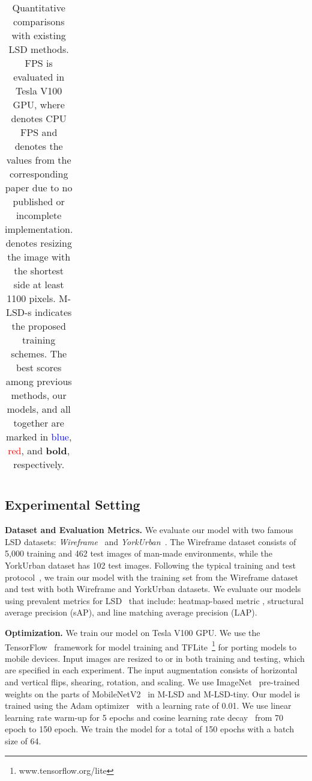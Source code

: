 \documentclass[letterpaper]{article} \usepackage{aaai22}  \usepackage{times}  \usepackage{helvet}  \usepackage{courier}  \usepackage[hyphens]{url}  \usepackage{graphicx} \urlstyle{rm} \def\UrlFont{\rm}  \usepackage{natbib}  \usepackage{caption} \DeclareCaptionStyle{ruled}{labelfont=normalfont,labelsep=colon,strut=off} \frenchspacing  \setlength{\pdfpagewidth}{8.5in}  \setlength{\pdfpageheight}{11in}  \usepackage{algorithm}
\begin{document}
\begin{table*}[t!]
\begin{adjustbox}{width=0.8\textwidth,center}
\begin{tabular}{lcccccccccccc}
\bottomrule
\end{tabular}
\end{adjustbox}
\caption{Quantitative comparisons with existing LSD methods. FPS is evaluated in Tesla V100 GPU, where  denotes CPU FPS and  denotes the values from the corresponding paper due to no published or incomplete implementation.  denotes resizing the image with the shortest side at least 1100 pixels. M-LSD-s indicates the proposed training schemes. The best scores among previous methods, our models, and all together are marked in \textcolor{blue}{blue}, \textcolor{red}{red}, and \textbf{bold}, respectively.}
\label{table:sota}
\end{table*}

\subsection{Experimental Setting}
\textbf{Dataset and Evaluation Metrics. }
We evaluate our model with two famous LSD datasets: \textit{Wireframe}~\cite{huang2018learning} and \textit{YorkUrban}~\cite{denis2008efficient}.
The Wireframe dataset consists of 5,000 training and 462 test images of man-made environments, while the YorkUrban dataset has 102 test images.
Following the typical training and test protocol~\cite{huang2020tp,zhou2019end}, we train our model with the training set from the Wireframe dataset and test with both Wireframe and YorkUrban datasets.
We evaluate our models using prevalent metrics for LSD~\cite{huang2020tp,zhang2019ppgnet,meng2020lgnn,xue2019learning,zhou2019end} that include: heatmap-based metric , structural average precision (sAP), and line matching average precision (LAP).

\textbf{Optimization. }
We train our model on Tesla V100 GPU.
We use the TensorFlow~\cite{abadi2016tensorflow} framework for model training and TFLite~\footnote{www.tensorflow.org/lite} for porting models to mobile devices.
Input images are resized to  or  in both training and testing, which are specified in each experiment.
The input augmentation consists of horizontal and vertical flips, shearing, rotation, and scaling.
We use ImageNet~\cite{deng2009imagenet} pre-trained weights on the parts of MobileNetV2~\cite{sandler2018mobilenetv2} in M-LSD and M-LSD-tiny.
Our model is trained using the Adam optimizer~\cite{kingma2014adam} with a learning rate of 0.01.
We use linear learning rate warm-up for 5 epochs and cosine learning rate decay~\cite{loshchilov2016sgdr} from 70 epoch to 150 epoch.
We train the model for a total of 150 epochs with a batch size of 64.
\end{document}
